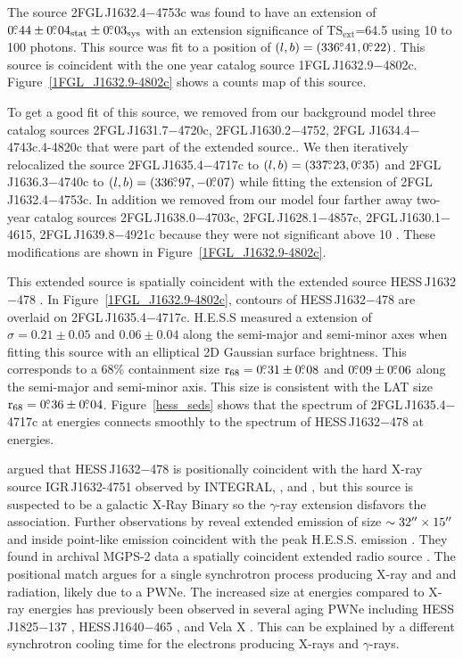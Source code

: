 \documentclass[12pt,preprint]{aastex}
\newcommand{\gev}{\text{GeV}\xspace}
\newcommand{\tev}{\text{TeV}\xspace}
\newcommand{\tsext}{{\ensuremath{\text{TS}_{\text{ext}}}}\xspace}
\newcommand{\asca}{\text{{\em ASCA}}\xspace}
\newcommand{\xmmnewton}{\text{{\em XMM-Newton}}\xspace}
\newcommand{\rsixeight}{{\ensuremath{\text{r}_{68}}}\xspace}
\newcommand{\sys}{\text{sys}\xspace}
\newcommand{\stat}{\text{stat}\xspace}
\newcommand{\hl}[1]{#1}
\begin{document}
The source 2FGL\,J1632.4$-$4753c was found 
to
have an extension of $0\fdg44\pm0\fdg04_\stat\pm0\fdg03_\sys$ 
with an extension
significance of \tsext=64.5
using 10 \gev to 100 \gev photons.  This source was fit to a position of
$(l,b)=(336\mbox{$.\!\!^\circ$}41,0\mbox{$.\!\!^\circ$}22)$.  This source is coincident with the one
year catalog source 1FGL\,J1632.9$-$4802c.  Figure~\ref{1FGL_J1632.9-4802c}
shows a counts map of this source.

To get a good fit of this source, we removed from our background model
three catalog sources 2FGL\,J1631.7$-$4720c, 2FGL\,J1630.2$-$4752,
2FGL J1634.4$-$4743c.4-4820c that were part of the extended source..
We then iteratively relocalized the source 2FGL\,J1635.4$-$4717c
to $(l,b)=(337\mbox{$.\!\!^\circ$}23,0\mbox{$.\!\!^\circ$}35)$ and 2FGL\,J1636.3$-$4740c to
$(l,b)=(336\mbox{$.\!\!^\circ$}97,-0\mbox{$.\!\!^\circ$}07)$ while fitting the extension of
2FGL\,J1632.4$-$4753c.  In addition we removed from our model four
farther away two-year catalog sources 2FGL\,J1638.0$-$4703c, 
2FGL\,J1628.1$-$4857c, 2FGL\,J1630.1$-$4615, 2FGL\,J1639.8$-$4921c because they
were not significant above 10 \gev.  These modifications are shown
in Figure~\ref{1FGL_J1632.9-4802c}.  

This extended source is spatially coincident with the extended
\tev source HESS\,J1632$-$478 \citep{hess_plane_survey}.
In Figure~\ref{1FGL_J1632.9-4802c}, contours of  HESS\,J1632$-$478
are overlaid on 2FGL\,J1635.4$-$4717c.  H.E.S.S measured a 
extension of $\sigma=0.21\pm0.05$ and $0.06\pm0.04$ along the
semi-major and semi-minor axes when fitting this source with an
elliptical 2D Gaussian surface brightness.  This corresponds to a 68\%
containment size $\rsixeight=0\fdg31\pm0\fdg08$ and $0\mbox{$.\!\!^\circ$}09\pm0\mbox{$.\!\!^\circ$}06$
along the semi-major and semi-minor axis. This size is consistent with
the LAT size $\rsixeight=0\fdg36\pm0\fdg04$.  Figure~\ref{hess_seds}
shows that the spectrum of 2FGL\,J1635.4$-$4717c at \gev energies
connects smoothly to
the spectrum of HESS\,J1632$-$478 at \tev energies.

\hl{
\cite{hess_plane_survey} argued that HESS\,J1632$-$478
is positionally coincident with the hard X-ray source
IGR\,J1632-4751 observed by INTEGRAL, \xmmnewton, and \asca
\citep{Igr_J16320-4751_circ,xmm_newton_IGR_J16320-4751,asca_plane_survey},
but this source is suspected to be a galactic X-Ray Binary so the $\gamma$-ray
extension disfavors the association.  Further observations by
\xmmnewton reveal extended emission of size $\sim32\mbox{$^{\prime\prime}$}\times15\mbox{$^{\prime\prime}$}$
and inside point-like emission coincident with the peak
H.E.S.S. emission \citep{hess_j1632_478_xmm_newton}.  They found
in archival MGPS-2 data a spatially coincident extended radio source
\citep{most_survey_galactic_plane}.  The positional match argues for a
single synchrotron process producing X-ray and \gev and \tev radiation,
likely due to a PWNe.  The increased size at \tev energies
compared
to X-ray energies has previously been observed in several aging PWNe
including HESS\,J1825$-$137 \citep{hess_j1825_xmm_newton,hess_j1825_hess},
HESS\,J1640$-$465 \citep{hess_plane_survey,xmm_newton_hess_j_1640-466},
and Vela X \citep{vela_x_rosat,vela_x_hess}.  This can be explained by
a different synchrotron cooling time for the electrons producing X-rays
and \tev $\gamma$-rays.
}
\end{document}
